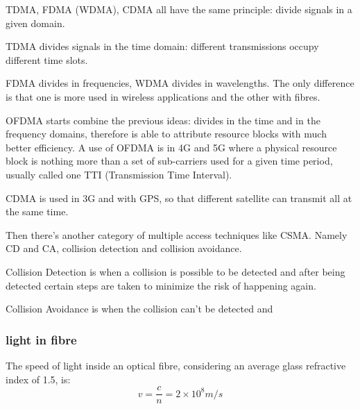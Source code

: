 TDMA, FDMA (WDMA), CDMA all have the same principle: divide signals in a given domain. 

TDMA divides signals in the time domain: different transmissions occupy different time slots.

FDMA divides in frequencies, WDMA divides in wavelengths. The only difference is that one is more used in wireless applications and the other with fibres.



OFDMA starts combine the previous ideas: divides in the time and in the frequency domains, therefore is able to attribute resource blocks with much better efficiency. A use of OFDMA is in 4G and 5G where a physical resource block is nothing more than a set of sub-carriers used for a given time period, usually called one TTI (Transmission Time Interval).

CDMA is used in 3G and with GPS, so that different satellite can transmit all at the same time.

Then there's another category of multiple access techniques like CSMA. Namely CD and CA, collision detection and collision avoidance. 


Collision Detection is when a collision is possible to be detected and after being detected certain steps are taken to minimize the risk of happening again.

Collision Avoidance is when the collision can't be detected and 


\subsubsection{light in fibre}
The speed of light inside an optical fibre, considering an average glass refractive index of 1.5, is:
\begin{equation}
    v = \frac{c}{n} = 2 \times 10^8 m/s
\end{equation}

